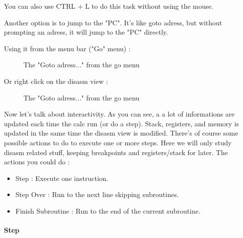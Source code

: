 \documentclass[10pt]{report}
\begin{document}
You can also use CTRL + L to do this task without using the mouse.\newline

Another option is to jump to the "PC". It's like goto adress, but without prompting an adress, it will jump to the "PC" directly.\newline

Using it from the menu bar ("Go" menu) : \newline
\begin{figure}[H]
\centering
{}
\caption{The "Goto adress..." from the go menu}
\end{figure}

Or right click on the disasm view :\newline
\begin{figure}[H]
\centering
{}
\caption{The "Goto adress..." from the go menu}
\end{figure}

Now let's talk about interactivity.\newline
As you can see, a a lot of informations are updated each time the calc run (or do a step).\newline
Stack, registers, and memory is updated in the same time the disasm view is modified.\newline
There's of course some possible actions to do to execute one or more steps.\newline
Here we will only study disasm related stuff, keeping breakpoints and registers/stack for later.\newline
The actions you could do :\newline

\begin{itemize}
\item Step : Execute one instruction.
\item Step Over : Run to the next line skipping subroutines.
\item Finish Subroutine : Run to the end of the current subroutine.
\end{itemize}

\paragraph{Step}
\end{document}
